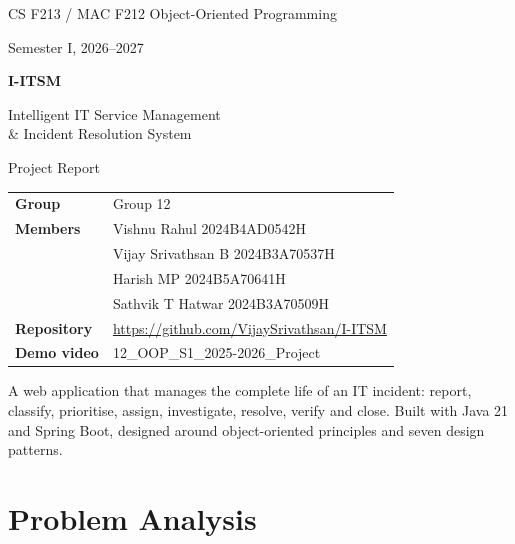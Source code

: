 \documentclass[11pt,a4paper]{article}
\newcommand{\groupno}{12}
\newcommand{\repourl}{https://github.com/VijaySrivathsan/I-ITSM}
\newcommand{\videoname}{\groupno\_OOP\_S1\_2025-2026\_Project}
\begin{document}
\begin{titlepage}
\thispagestyle{empty}
\vspace*{2.2cm}
{\headingfont\color{muted}\large CS F213 / MAC F212 Object-Oriented Programming\par}
{\headingfont\color{muted}\large Semester I, 2026--2027\par}
\vspace{1.6cm}
{\headingfont\bfseries\color{brand}\fontsize{34}{40}\selectfont I-ITSM\par}
\vspace{0.4cm}
{\headingfont\color{brand2}\LARGE Intelligent IT Service Management\\[0.2em] \& Incident Resolution System\par}
\vspace{0.8cm}
{\Large Project Report\par}
\vspace{1.8cm}
{\large
\begin{tabular}{@{}L{3.6cm}L{10cm}@{}}
\textbf{Group} & Group \groupno \\
\textbf{Members} & Vishnu Rahul \hfill 2024B4AD0542H \\
 & Vijay Srivathsan B \hfill 2024B3A70537H \\
 & Harish MP \hfill 2024B5A70641H \\
 & Sathvik T Hatwar \hfill 2024B3A70509H \\
\textbf{Repository} & \url{\repourl} \\
\textbf{Demo video} & \videoname \\
\end{tabular}\par}
\vfill
{\color{muted}A web application that manages the complete life of an IT incident: report, classify, prioritise, assign, investigate, resolve, verify and close. Built with Java 21 and Spring Boot, designed around object-oriented principles and seven design patterns.\par}
\end{titlepage}

\setcounter{tocdepth}{1}
\tableofcontents
\clearpage

\section{Problem Analysis}
\end{document}
